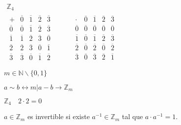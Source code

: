 \documentclass[12pt]{article}
\begin{document}
$\begin{array}{ll}
\mathbb{Z}_4 & \\
\begin{array}{c|cccc}
+ & \overline{0} & \overline{1} & \overline{2} & \overline{3} \\ \hline
\overline{0} & \overline{0} & \overline{1} & \overline{2} & \overline{3} \\ 
\overline{1} & \overline{1} & \overline{2} & \overline{3} & \overline{0} \\ 
\overline{2} & \overline{2} & \overline{3} & \overline{0} & \overline{1} \\ 
\overline{3} & \overline{3} & \overline{0} & \overline{1} & \overline{2}
\end{array} & \qquad\begin{array}{c|cccc}
\cdot & \overline{0} & \overline{1} & \overline{2} & \overline{3} \\ \hline
\overline{0} & \overline{0} & \overline{0} & \overline{0} & \overline{0} \\ 
\overline{1} & \overline{0} & \overline{1} & \overline{2} & \overline{3} \\ 
\overline{2} & \overline{0} & \overline{2} & \overline{0} & \overline{2} \\ 
\overline{3} & \overline{0} & \overline{3} & \overline{2} & \overline{1}
\end{array}  
\end{array}$

$m\in\mathbb{N}\backslash\{0,1\}$

$a\sim b\longleftrightarrow m|a-b\rightarrow\mathbb{Z}_m$

$\mathbb{Z}_4\quad2\cdot2=0$

$a\in\mathbb{Z}_m$ es invertible si existe $a^{-1}\in\mathbb{Z}_m$ tal que $a\cdot a^{-1}=1$.
\end{document}
